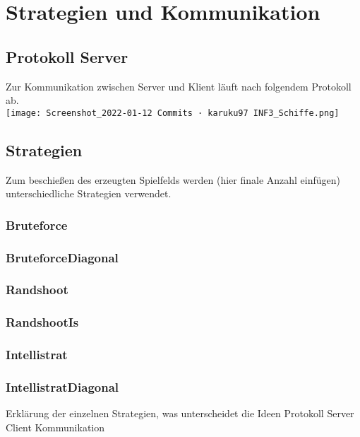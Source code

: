 \section*{Strategien und Kommunikation}

\subsection*{Protokoll Server}
Zur Kommunikation zwischen Server und Klient läuft nach folgendem Protokoll ab.\\
\texttt{[image: Screenshot\_2022-01-12 Commits · karuku97 INF3\_Schiffe.png]}
\\
\subsection*{Strategien}
Zum beschießen des erzeugten Spielfelds werden (hier finale Anzahl einfügen) unterschiedliche Strategien verwendet.

\subsubsection*{Bruteforce}

\subsubsection*{BruteforceDiagonal}

\subsubsection{Randshoot}

\subsubsection*{RandshootIs}

\subsubsection*{Intellistrat}

\subsubsection{IntellistratDiagonal}


Erklärung der einzelnen Strategien, was unterscheidet die Ideen
Protokoll Server Client Kommunikation
